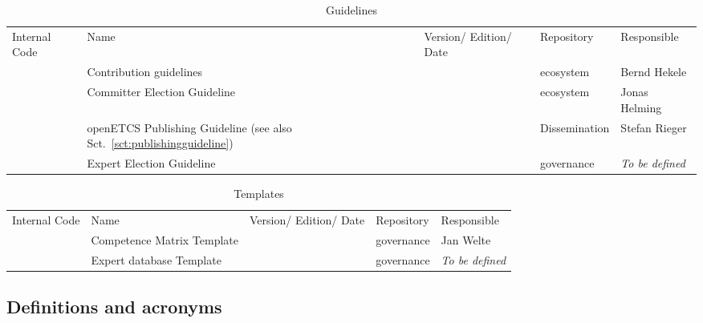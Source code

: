 \documentclass{template/openetcs_article}
\begin{document}
\begin{table}[H]
\begin{tabular}{|m{1.5cm}|m{}|m{}|m{2cm}|m{}|}
\hline
\rowcolor{myblue}
\multicolumn{5}{|c|}{Guidelines} \\\hline
\rowcolor{lightgray}
Internal Code &
Name &
Version/ Edition/ Date &
Repository &
Responsible  
\\\hline
\cite{Contribution} &
Contribution guidelines &
\centering 01 &
ecosystem &
Bernd Hekele\\\hline
\cite{committer} &
Committer Election Guideline &
\centering &
ecosystem &
Jonas Helming\\\hline
\cite{PublishingGuideline} &
openETCS Publishing Guideline (see also Sct.~\ref{sct:publishingguideline})&
\centering &
Dissemination &
Stefan Rieger\\\hline
\cite{expertguide} &
Expert Election Guideline &
\centering &
governance &
\it {To be defined}\\\hline
\end{tabular}
\caption{Guidelines}
\end{table}

\begin{table}[H]
\begin{tabular}{|m{1.5cm}|m{}|m{}|m{2cm}|m{}|}
\hline
\rowcolor{myblue}
\multicolumn{5}{|c|}{Templates} \\\hline
\rowcolor{lightgray}
Internal Code &
Name &
Version/ Edition/ Date &
Repository &
Responsible  
\\\hline
\cite{Competence} &
Competence Matrix Template &
\centering  &
governance &
Jan Welte\\\hline
\cite{expert} &
Expert database Template &
\centering &
governance &
\it {To be defined}\\\hline
\end{tabular}
\caption{Templates}
\end{table}


\subsection{Definitions and acronyms}
\end{document}
